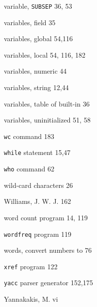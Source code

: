 \begin{multicols}{3}
\hangindent=3pc  variable, \verb'SUBSEP' 36, 53

\hangindent=3pc  variables, field 35

\hangindent=3pc  variables, global 54,116

\hangindent=3pc  variables, local 54, 116, 182

\hangindent=3pc  variables, numeric 44

\hangindent=3pc  variables, string 12,44

\hangindent=3pc  variables, table of built-in 36

\hangindent=3pc  variables, uninitialized 51, 58

\hangindent=3pc  \verb'wc' command 183

\hangindent=3pc  \verb'while' statement 15,47

\hangindent=3pc  \verb'who' command 62

\hangindent=3pc  wild-card characters 26

\hangindent=3pc  Williams, J. W. J. 162

\hangindent=3pc  word count program 14, 119

\hangindent=3pc  \verb'wordfreq' program 119

\hangindent=3pc  words, convert numbers to 76

\hangindent=3pc  \verb'xref' program 122

\hangindent=3pc  \verb'yacc' parser generator 152,175

\hangindent=3pc  Yannakakis, M. vi

\end{multicols}
